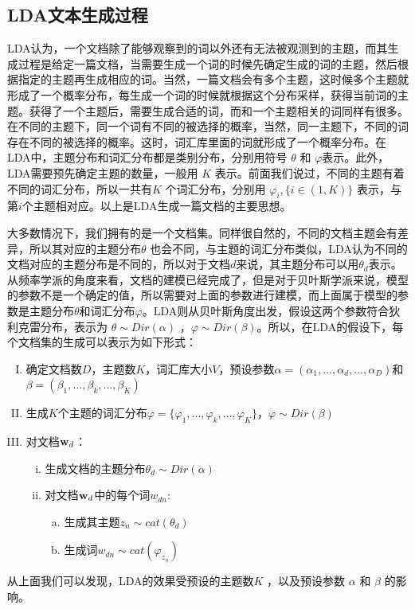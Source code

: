 \documentclass[twocolumn]{article}
\begin{document}
\subsection{LDA文本生成过程}
    LDA认为，一个文档除了能够观察到的词以外还有无法被观测到的主题，而其生成过程是给定一篇文档，当需要生成一个词的时候先确定生成的词的主题，然后根据指定的主题再生成相应的词。当然，一篇文档会有多个主题，这时候多个主题就形成了一个概率分布，每生成一个词的时候就根据这个分布采样，获得当前词的主题。获得了一个主题后，需要生成合适的词，而和一个主题相关的词同样有很多。在不同的主题下，同一个词有不同的被选择的概率，当然，同一主题下，不同的词存在不同的被选择的概率。这时，词汇库里面的词就形成了一个概率分布。在LDA中，主题分布和词汇分布都是类别分布，分别用符号 $ \theta $ 和 $ \varphi $表示。此外，LDA需要预先确定主题的数量，一般用 $ K $ 表示。前面我们说过，不同的主题有着不同的词汇分布，所以一共有$ K $ 个词汇分布，分别用 $ \varphi_i, \{i \in (1, K)\} $ 表示，与第$ i $个主题相对应。以上是LDA生成一篇文档的主要思想。
    
    大多数情况下，我们拥有的是一个文档集。同样很自然的，不同的文档主题会有差异，所以其对应的主题分布$ \theta $ 也会不同，与主题的词汇分布类似，LDA认为不同的文档对应的主题分布是不同的，所以对于文档$ d $来说，其主题分布可以用$ \theta_d $表示。从频率学派的角度来看，文档的建模已经完成了，但是对于贝叶斯学派来说，模型的参数不是一个确定的值，所以需要对上面的参数进行建模，而上面属于模型的参数是主题分布$ \theta $和词汇分布$ \varphi $。LDA则从贝叶斯角度出发，假设这两个参数符合狄利克雷分布，表示为 $ \theta \sim Dir(\alpha)$ ，$\varphi \sim Dir(\beta)$。所以，在LDA的假设下，每个文档集的生成可以表示为如下形式：
\begin{enumerate}[I.]
    \item 确定文档数$ D $，主题数$ K $，词汇库大小$ V $，预设参数$ \alpha = (\alpha_1,...,\alpha_d,...,\alpha_D) $和$ \beta = (\beta_1,...,\beta_k,...,\beta_K) $
    \item 生成$ K $个主题的词汇分布$ \varphi = \{\varphi_1,...,\varphi_k,...,\varphi_K\} $，$ \varphi \sim Dir(\beta) $
    \item 对文档$ {{\bf{w}}_d} $：
           \begin{enumerate}[i.]
                  \item 生成文档的主题分布$ \theta_d \sim Dir(\alpha) $
                  \item 对文档$ {{\bf{w}}_d} $中的每个词$ w_{dn} $:
                          \begin{enumerate}[a.]
                              \item 生成其主题$ z_n \sim cat(\theta_d) $
                              \item 生成词$ w_{dn} \sim cat(\varphi_{z_n}) $
                          \end{enumerate}
          \end{enumerate}
\end{enumerate}
从上面我们可以发现，LDA的效果受预设的主题数$ K $ ，以及预设参数 $ \alpha $ 和 $ \beta $ 的影响。
\end{document}
